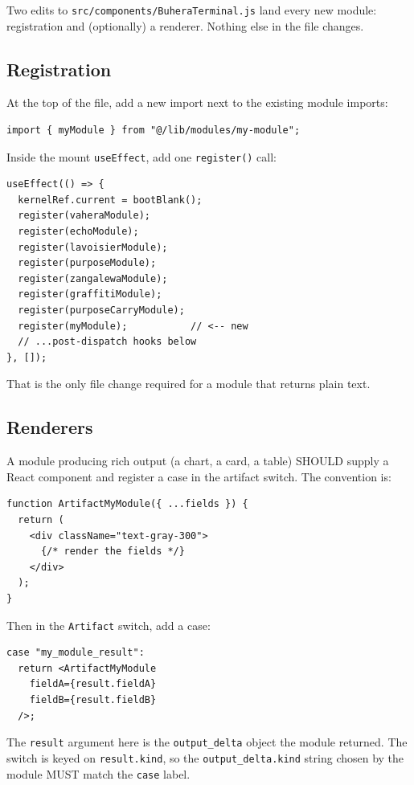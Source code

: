 \documentclass[11pt,a4paper]{article}
\theoremstyle{contract}
\begin{document}
Two edits to \texttt{src/components/BuheraTerminal.js} land every new
module: registration and (optionally) a renderer. Nothing else in the
file changes.

\subsection{Registration}

At the top of the file, add a new import next to the existing module
imports:

\begin{lstlisting}
import { myModule } from "@/lib/modules/my-module";
\end{lstlisting}

Inside the mount \texttt{useEffect}, add one \texttt{register()} call:

\begin{lstlisting}
useEffect(() => {
  kernelRef.current = bootBlank();
  register(vaheraModule);
  register(echoModule);
  register(lavoisierModule);
  register(purposeModule);
  register(zangalewaModule);
  register(graffitiModule);
  register(purposeCarryModule);
  register(myModule);           // <-- new
  // ...post-dispatch hooks below
}, []);
\end{lstlisting}

That is the only file change required for a module that returns plain
text.

\subsection{Renderers}

A module producing rich output (a chart, a card, a table) SHOULD supply
a React component and register a case in the artifact switch. The
convention is:

\begin{lstlisting}
function ArtifactMyModule({ ...fields }) {
  return (
    <div className="text-gray-300">
      {/* render the fields */}
    </div>
  );
}
\end{lstlisting}

Then in the \texttt{Artifact} switch, add a case:

\begin{lstlisting}
case "my_module_result":
  return <ArtifactMyModule
    fieldA={result.fieldA}
    fieldB={result.fieldB}
  />;
\end{lstlisting}

The \texttt{result} argument here is the \texttt{output\_delta} object
the module returned. The switch is keyed on \texttt{result.kind}, so
the \texttt{output\_delta.kind} string chosen by the module MUST match
the \texttt{case} label.
\end{document}

